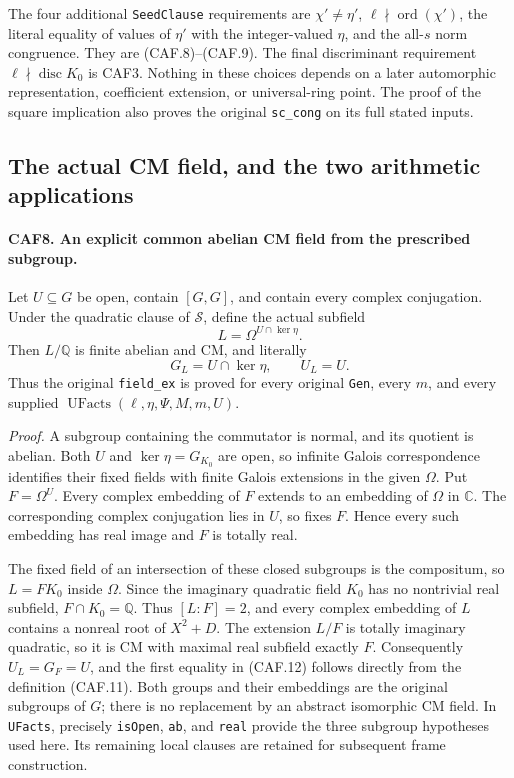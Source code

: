 The four additional \texttt{SeedClause} requirements are
\(\chi'\ne\eta'\), \(\ell\nmid\operatorname{ord}(\chi')\),
the literal equality of values of \(\eta'\) with the integer-valued
\(\eta\), and the all-\(s\) norm congruence.  They are (CAF.8)--(CAF.9).
The final discriminant requirement \(\ell\nmid\operatorname{disc}K_0\)
is CAF3.  Nothing in these choices depends on a later automorphic
representation, coefficient extension, or universal-ring point.
The proof of the square implication also proves the original
\texttt{sc\_cong} on its full stated inputs.

\subsection{The actual CM field, and the two arithmetic applications}

\paragraph{CAF8. An explicit common abelian CM field from the prescribed subgroup.}
\label{claim:CAF8}
Let \(U\subseteq G\) be open, contain \([G,G]\), and contain
every complex conjugation.  Under the quadratic clause of
\(\mathcal S\), define the actual subfield
\[
                   L=\Omega^{U\cap\ker\eta}.
 \tag{CAF.11}
\]
Then \(L/\mathbb Q\) is finite abelian and CM, and literally
\[
             G_L=U\cap\ker\eta,\qquad U_L=U.
 \tag{CAF.12}
\]
Thus the original \texttt{field\_ex} is proved for every original
\texttt{Gen}, every \(m\), and every supplied
\(\operatorname{UFacts}(\ell,\eta,\Psi,M,m,U)\).

\emph{Proof.}
A subgroup containing the commutator is normal, and its quotient is
abelian.  Both \(U\) and \(\ker\eta=G_{K_0}\) are open, so
infinite Galois correspondence identifies their fixed fields with
finite Galois extensions in the given \(\Omega\).  Put
\(F=\Omega^U\).  Every complex embedding of \(F\) extends to an
embedding of \(\Omega\) in \(\mathbb C\).  The corresponding
complex conjugation lies in \(U\), so fixes \(F\).  Hence every
such embedding has real image and \(F\) is totally real.

The fixed field of an intersection of these closed subgroups is the
compositum, so \(L=FK_0\) inside \(\Omega\).  Since the imaginary
quadratic field \(K_0\) has no nontrivial real subfield,
\(F\cap K_0=\mathbb Q\).  Thus \([L:F]=2\), and every complex
embedding of \(L\) contains a nonreal root of \(X^2+D\).
The extension \(L/F\) is totally imaginary quadratic, so it is CM
with maximal real subfield exactly \(F\).  Consequently
\(U_L=G_F=U\), and the first equality in (CAF.12) follows directly
from the definition (CAF.11).  Both groups and their embeddings are
the original subgroups of \(G\); there is no replacement by an
abstract isomorphic CM field.  In \texttt{UFacts}, precisely
\texttt{isOpen}, \texttt{ab}, and \texttt{real} provide the three
subgroup hypotheses used here.  Its remaining local clauses are
retained for subsequent frame construction.

